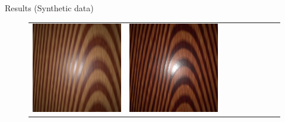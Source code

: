 \documentclass[final]{beamer}
\newlength{\twocolwid}
\newlength{\resultwidth}
\begin{document}
\begin{frame}[t]
\begin{columns}[t]
\begin{column}{\twocolwid}
\begin{block}{Results (Synthetic data)}
\begin{figure}[t]
\begin{tabular}{ccrclcccc}
            		\includegraphics[width=\resultwidth]{images/synth/wood/good3.jpg} &
            		\includegraphics[width=\resultwidth]{images/synth/wood//bad1.jpg}
            		\\

\end{tabular}
\end{figure}
\end{block}
\end{column}
\end{columns}
\end{frame}
\end{document}
